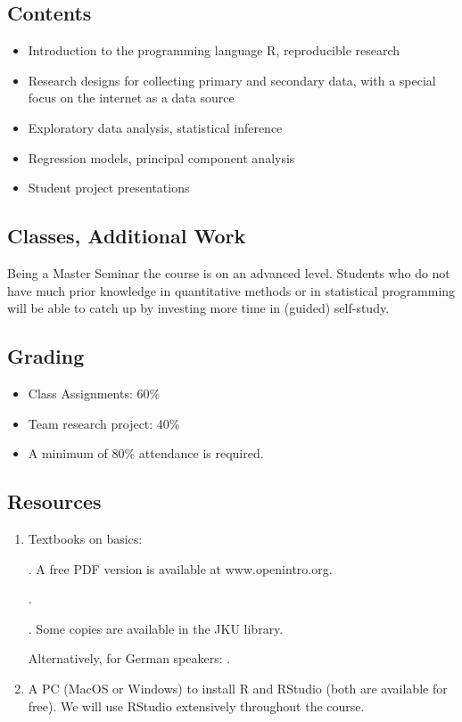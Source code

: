 \documentclass[]{article}
\begin{document}
\subsection{Contents}\label{contents}

\begin{itemize}
\itemsep1pt\parskip0pt
\item
  Introduction to the programming language R, reproducible research
\item
  Research designs for collecting primary and secondary data, with a
  special focus on the internet as a data source
\item
  Exploratory data analysis, statistical inference
\item
  Regression models, principal component analysis
\item
  Student project presentations
\end{itemize}

\subsection{Classes, Additional Work}\label{classes-additional-work}

Being a Master Seminar the course is on an advanced level. Students who
do not have much prior knowledge in quantitative methods or in
statistical programming will be able to catch up by investing more time
in (guided) self-study.

\subsection{Grading}\label{grading}

\begin{itemize}
\itemsep1pt\parskip0pt
\item
  Class Assignments: 60\%
\item
  Team research project: 40\%
\item
  A minimum of 80\% attendance is required.
\end{itemize}

\subsection{Resources}\label{resources}

\begin{enumerate}
\def\labelenumi{\arabic{enumi}.}
\item
  Textbooks on basics:

  . A free PDF version is available at
  www.openintro.org.

  .

  . Some copies are available in the JKU library.

  Alternatively, for German speakers: .
\item
  A PC (MacOS or Windows) to install R and RStudio (both are available
  for free). We will use RStudio extensively throughout the course.
\end{enumerate}
\end{document}

